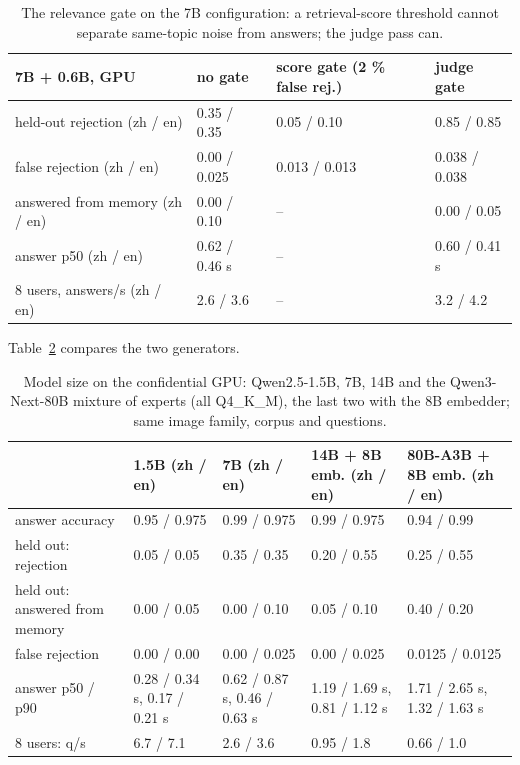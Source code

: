 \documentclass[letterpaper,twocolumn,10pt]{article}
\begin{document}
\begin{table}[t]\centering\small\setlength{\tabcolsep}{4pt}
\begin{tabular}{p{1.25in}p{0.6in}p{0.7in}p{0.6in}}\toprule
\textbf{7B + 0.6B, GPU} & \textbf{no gate} & \textbf{score gate (2 \% false rej.)} & \textbf{judge gate} \\ \midrule
held-out rejection (zh / en) & 0.35 / 0.35 & 0.05 / 0.10 & 0.85 / 0.85 \\
false rejection (zh / en) & 0.00 / 0.025 & 0.013 / 0.013 & 0.038 / 0.038 \\
answered from memory (zh / en) & 0.00 / 0.10 & -- & 0.00 / 0.05 \\
answer p50 (zh / en) & 0.62 / 0.46 s & -- & 0.60 / 0.41 s \\
8 users, answers/s (zh / en) & 2.6 / 3.6 & -- & 3.2 / 4.2 \\
\bottomrule\end{tabular}
\caption{The relevance gate on the 7B configuration: a retrieval-score threshold cannot separate same-topic noise from answers; the judge pass can.}\label{tab:gate}
\end{table}

Table~\ref{tab:model} compares the two generators.

\begin{table}[t]\centering\small\setlength{\tabcolsep}{4pt}
\begin{tabular}{p{1.25in}p{1.3in}p{1.3in}p{1.3in}p{1.4in}}\toprule
 & \textbf{1.5B (zh / en)} & \textbf{7B (zh / en)} & \textbf{14B + 8B emb. (zh / en)} & \textbf{80B-A3B + 8B emb. (zh / en)} \\ \midrule
answer accuracy & 0.95 / 0.975 & 0.99 / 0.975 & 0.99 / 0.975 & 0.94 / 0.99 \\
held out: rejection & 0.05 / 0.05 & 0.35 / 0.35 & 0.20 / 0.55 & 0.25 / 0.55 \\
held out: answered from memory & 0.00 / 0.05 & 0.00 / 0.10 & 0.05 / 0.10 & 0.40 / 0.20 \\
false rejection & 0.00 / 0.00 & 0.00 / 0.025 & 0.00 / 0.025 & 0.0125 / 0.0125 \\
answer p50 / p90 & 0.28 / 0.34 s, 0.17 / 0.21 s & 0.62 / 0.87 s, 0.46 / 0.63 s & 1.19 / 1.69 s, 0.81 / 1.12 s & 1.71 / 2.65 s, 1.32 / 1.63 s \\
8 users: q/s & 6.7 / 7.1 & 2.6 / 3.6 & 0.95 / 1.8 & 0.66 / 1.0 \\
\bottomrule\end{tabular}
\caption{Model size on the confidential GPU: Qwen2.5-1.5B, 7B, 14B and the Qwen3-Next-80B mixture of experts (all Q4\_K\_M), the last two with the 8B embedder; same image family, corpus and questions.}\label{tab:model}
\end{table}
\end{document}
